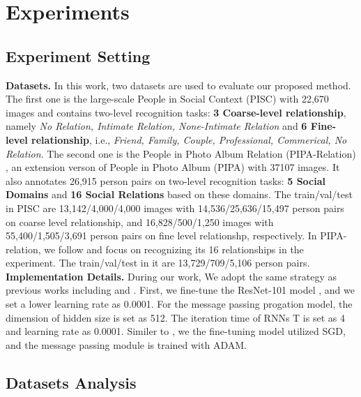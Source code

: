 \documentclass{article}
\begin{document}
\section{Experiments}

\subsection{Experiment Setting}

{\bf Datasets.} In this work, two datasets are used to evaluate our proposed method. The first one is the large-scale People in Social Context (PISC) \cite{DBLP:conf/iccv/LiWZK17} with 22,670 images and contains two-level recognition tasks: {\bf 3 Coarse-level relationship}, namely {\it No Relation, Intimate Relation, None-Intimate Relation} and {\bf 6 Fine-level relationship}, i.e., {\it Friend, Family, Couple, Professional, Commerical, No Relation}. The second one is the People in Photo Album Relation (PIPA-Relation) \cite{DBLP:conf/cvpr/SunSF17}, an extension verson of People in Photo Album (PIPA) \cite{DBLP:conf/cvpr/ZhangPTFB15} with 37107 images. It also annotates 26,915 person pairs on two-level recognition tasks: {\bf 5 Social Domains} and {\bf 16 Social Relations} based on these domains. The train/val/test in PISC are 13,142/4,000/4,000 images with 14,536/25,636/15,497 person pairs on coarse level relationship, and 16,828/500/1,250 images with 55,400/1,505/3,691 person pairs on fine level relationshp, respectively. In PIPA-relation, we follow \cite{DBLP:conf/ijcai/WangCRYCL18} and focus on recognizing its 16 relationships in the experiment. The train/val/test in it are 13,729/709/5,106 person pairs. \\
{\bf Implementation Details.} During our work, We adopt the same strategy as previous works including \cite{DBLP:conf/iccv/LiWZK17} and \cite{DBLP:conf/ijcai/WangCRYCL18}. First, we fine-tune the ResNet-101 model \cite{DBLP:conf/cvpr/HeZRS16} , and we set a lower learning rate as 0.0001. For the message passing progation model, the dimension of hidden size is set as 512. The iteration time of RNNs T is set as 4 and learning rate as 0.0001. Similer to \cite{DBLP:conf/ijcai/WangCRYCL18}, we the fine-tuning model utilized SGD, and the message passing module is trained with ADAM.

\subsection{Datasets Analysis}\label{section:dataset_anaysis}
\end{document}
